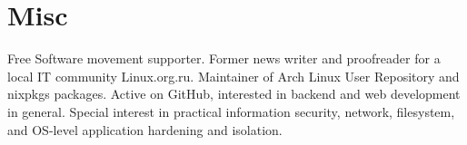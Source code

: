 \section{Misc}
Free Software movement supporter. Former news writer and proofreader for a local IT community
Linux.org.ru. Maintainer of Arch Linux User Repository and nixpkgs packages. Active on GitHub,
interested in backend and web development in general. Special interest in practical information
security, network, filesystem, and OS-level application hardening and isolation.
